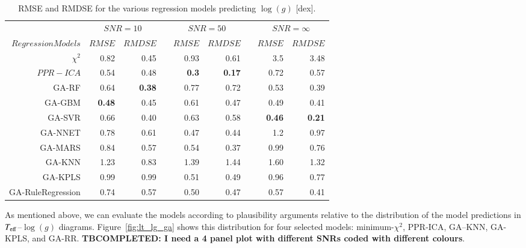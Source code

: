 %
%
\begin{table}\centering
\begin{tabular}{@{}rrrcrrcrr@{}}\toprule
& \multicolumn{2}{c}{$SNR = 10$} & \phantom{ab}& \multicolumn{2}{c}{$SNR = 50$} &
\phantom{ab} & \multicolumn{2}{c}{$SNR = \infty$}\\
\cmidrule{2-3} \cmidrule{5-6} \cmidrule{8-9}
$Regression Models$ & $RMSE$ & $RMDSE$ && $RMSE$ & $RMDSE$     && $RMSE$       & $RMDSE$ \\ \midrule
$\chi^2$          & 0.82       & 0.45      && 0.93       & 0.61       && 3.5        & 3.48 \\
$ PPR-ICA$        & 0.54       & 0.48      && {\bf 0.3}  & {\bf 0.17} && 0.72       & 0.57 \\
GA-RF             & 0.64       & \bf{0.38} && 0.77       & 0.72       && 0.53       & 0.39 \\
GA-GBM            & {\bf 0.48} & 0.45      && 0.61       & 0.47       && 0.49       & 0.41 \\
GA-SVR            & 0.66       & 0.40      && 0.63       & 0.58       && {\bf 0.46} & \bf{0.21} \\
GA-NNET           & 0.78       & 0.61      && 0.47       & 0.44       && 1.2        & 0.97 \\
GA-MARS           & 0.84       & 0.57      && 0.54       & 0.37       && 0.99       & 0.76 \\
GA-KNN            & 1.23       & 0.83      && 1.39       & 1.44       && 1.60       & 1.32 \\
GA-KPLS           & 0.99       & 0.99      && 0.51       & 0.49       && 0.96       & 0.77 \\
GA-RuleRegression & 0.74       & 0.57      && 0.50       & 0.47       && 0.57       & 0.41 \\

\bottomrule
\end{tabular}
\caption {RMSE and RMDSE for the various regression models predicting $\log(g)$ [dex].} 
\label{tab:models_G_rmse} 
\end{table}

As mentioned above, we can evaluate the models according to
plausibility arguments relative to the distribution of the model
predictions in $T_{\rm eff}$--$\log(g)$
diagrams. Figure~\ref{fig:lt_lg_ga} shows this distribution for four
selected models: minimum-$\chi^2$, PPR-ICA, GA--KNN, GA-KPLS, and
GA-RR. {\bf TBCOMPLETED: I need a 4 panel plot with different SNRs
  coded with different colours}.

